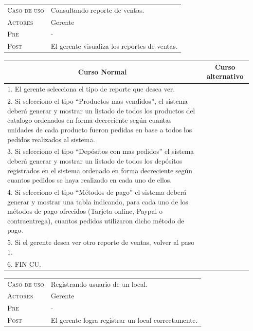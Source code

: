 \newpage

\begin{tabular}{p{} p{}}
    \textsc{Caso de uso} & Consultando reporte de ventas. \\
    \textsc{Actores} & Gerente \\
    \textsc{Pre} & - \\
    \textsc{Post} & El gerente visualiza los reportes de ventas. \\
\end{tabular}

\begin{center}
\begin{tabular}{|p{}|p{}|}
    \hline
    \multicolumn{1}{|c|}{Curso Normal} &
    \multicolumn{1}{|c|}{Curso alternativo} \\
    \hline
    1. El gerente selecciona el tipo de reporte que desea ver. & \\
    2. Si selecciono el tipo ``Productos mas vendidos'', el sistema deberá generar y mostrar un listado de todos los productos del catalogo ordenados en forma decreciente según cuantas unidades de cada producto fueron pedidas en base a todos los pedidos realizados al sistema. & \\
    3. Si selecciono el tipo ``Depósitos con mas pedidos'' el sistema deberá generar y mostrar un listado de todos los depósitos registrados en el sistema ordenado en forma decreciente según cuantos pedidos se haya realizado en cada uno de ellos. & \\
    4. Si selecciono el tipo ``Métodos de pago'' el sistema deberá generar y mostrar una tabla indicando, para cada uno de los métodos de pago ofrecidos (Tarjeta online, Paypal o contraentrega), cuantos pedidos utilizaron dicho método de pago. & \\
    5. Si el gerente desea ver otro reporte de ventas, volver al paso 1. & \\
    6. FIN CU. & \\
    \hline
\end{tabular}
\end{center}

\vspace{2cm}

\begin{tabular}{p{} p{}}
    \textsc{Caso de uso} & Registrando usuario de un local. \\
    \textsc{Actores} & Gerente \\
    \textsc{Pre} & - \\
    \textsc{Post} & El gerente logra registrar un local correctamente. \\
\end{tabular}

